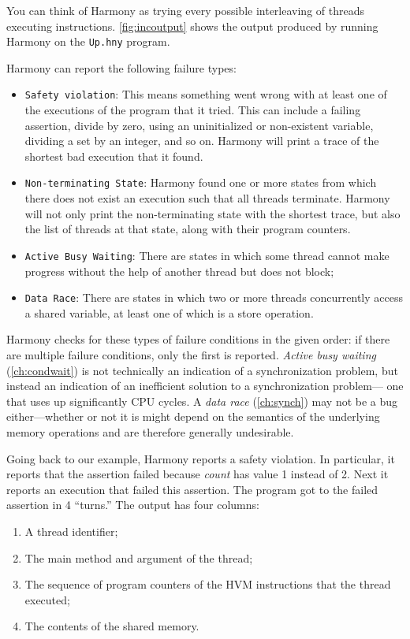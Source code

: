 \documentclass{report}
\begin{document}
You can think of Harmony as trying every possible interleaving of threads executing
instructions.
\autoref{fig:incoutput} shows the output produced by running Harmony on the
\texttt{Up.hny} program.

Harmony can report the following failure types:
\begin{itemize}
\item \texttt{Safety violation}: This means something went wrong with
at least one of the executions of the program that it tried.  This
can include a failing assertion, divide by zero, using an uninitialized
or non-existent variable, dividing a set by an integer, and so on.
Harmony will print a trace of the shortest bad execution that it found.
\item \texttt{Non-terminating State}: Harmony found one or more states
from which there does not exist an execution such that all threads
terminate.  Harmony will not only print the non-terminating state with
the shortest trace, but also the list of threads
at that state, along with their program counters.
\item \texttt{Active Busy Waiting}:  There are states in which
some thread cannot make progress without the help of another thread but
does not block;
\item \texttt{Data Race}: There are states in which two or more threads
concurrently access a shared variable, at least one of which is a store
operation.
\end{itemize}

Harmony checks for these types of failure conditions in the given
order: if there are multiple failure conditions, only the first is
reported.  \emph{Active busy waiting} (\autoref{ch:condwait}) is not
technically an indication of a synchronization problem, but instead an
indication of an inefficient solution to a synchronization problem---
one that uses up significantly CPU cycles.
A \emph{data race} (\autoref{ch:synch}) may not be a bug either---whether or
not it is might depend on the semantics of the underlying memory
operations and are therefore generally undesirable.

Going back to our example, Harmony reports a safety violation.
In particular, it reports that the assertion failed
because \textit{count} has value 1 instead of 2.
Next it reports an execution that failed this assertion.
The program got to the failed assertion in 4 ``turns.''
The output has four columns:
\begin{enumerate}
\item A thread identifier;
\item The main method and argument of the thread;
\item The sequence of program counters of the HVM instructions that the thread executed;
\item The contents of the shared memory.
\end{enumerate}
\end{document}
